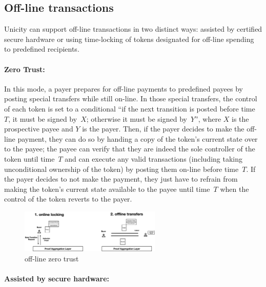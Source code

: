 \documentclass{article}
\begin{document}
\subsection{Off-line transactions}

Unicity can support off-line transactions in two distinct ways: assisted by certified secure hardware or using time-locking of tokens designated for off-line spending to predefined recipients.

\paragraph{Zero Trust:}

In this mode, a payer prepares for off-line payments to predefined payees by posting special transfers while still on-line. In those special transfers, the control of each token is set to a conditional ``if the next transition is posted before time~$T$, it must be signed by~$X$; otherwise it must be signed by~$Y$'', where $X$ is the prospective payee and $Y$ is the payer. Then, if the payer decides to make the off-line payment, they can do so by handing a copy of the token's current state over to the payee; the payee can verify that they are indeed the sole controller of the token until time~$T$ and can execute any valid transactions (including taking unconditional ownership of the token) by posting them on-line before time~$T$. If the payer decides to not make the payment, they just have to refrain from making the token's current state available to the payee until time~$T$ when the control of the token reverts to the payer.



\begin{figure}[ht]
    \centering
    \includegraphics[width=0.6\textwidth]{offline_lock.png}
    \caption{off-line zero trust}
    \label{fig:LowLatency2}
\end{figure}


\paragraph{Assisted by secure hardware:}
\end{document}
